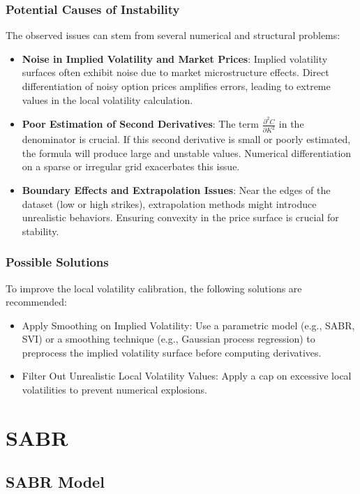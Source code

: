 \documentclass[11pt, oneside, a4paper, titlepage]{report}
\begin{document}
\subsubsection{Potential Causes of Instability}
The observed issues can stem from several numerical and structural problems:
\begin{itemize}
\item \textbf{Noise in Implied Volatility and Market Prices}:
Implied volatility surfaces often exhibit noise due to market microstructure effects. Direct differentiation of noisy option prices amplifies errors, leading to extreme values in the local volatility calculation.

\item \textbf{Poor Estimation of Second Derivatives}:
The term $\frac{\partial^2 C}{\partial K^2}$ in the denominator is crucial. If this second derivative is small or poorly estimated, the formula will produce large and unstable values. Numerical differentiation on a sparse or irregular grid exacerbates this issue.

\item \textbf{Boundary Effects and Extrapolation Issues}:
Near the edges of the dataset (low or high strikes), extrapolation methods might introduce unrealistic behaviors. Ensuring convexity in the price surface is crucial for stability.
\end{itemize}


\subsubsection{Possible Solutions}
To improve the local volatility calibration, the following solutions are recommended:
\begin{itemize}
\item Apply Smoothing on Implied Volatility: Use a parametric model (e.g., SABR, SVI) or a smoothing technique (e.g., Gaussian process regression) to preprocess the implied volatility surface before computing derivatives.
\item Filter Out Unrealistic Local Volatility Values: Apply a cap on excessive local volatilities to prevent numerical explosions.
\end{itemize}

\section{SABR}
\subsection{SABR Model}
\end{document}
